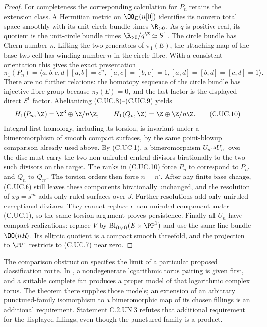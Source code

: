 \begin{proof}
For completeness the corresponding calculation
for $P_n$ retains the extension class. A Hermitian
metric on $\OO_E(n[0])$ identifies its nonzero
total space smoothly with its unit-circle bundle
times $\R_{>0}$. As $q$ is positive real, its
quotient is the unit-circle bundle times
$\R_{>0}/q^{\Z}\simeq S^1$. The circle bundle
has Chern number $n$. Lifting the two generators
of $\pi_1(E)$, the attaching map of the base
two-cell has winding number $n$ in the circle
fibre. With a consistent orientation this gives
the exact presentation
\[
 \pi_1(P_n)=
 \langle a,b,c,d\mid
 [a,b]=c^n,\ [a,c]=[b,c]=1,
 [a,d]=[b,d]=[c,d]=1\rangle.
\tag{C.UC.9}
\]
There are no further relations: the homotopy
sequence of the circle bundle has injective
fibre group because $\pi_2(E)=0$, and the last
factor is the displayed direct $S^1$ factor.
Abelianizing (C.UC.8)--(C.UC.9) yields
\[
 H_1(P_n,\Z)=\Z^3\oplus\Z/n\Z,
 \qquad H_1(Q_n,\Z)=\Z\oplus\Z/n\Z.
\tag{C.UC.10}
\]
Integral first homology, including its torsion,
is invariant under a bimeromorphism of smooth
compact surfaces, by the same point-blowup
comparison already used above. By (C.UC.1),
a bimeromorphism $U_n\dashrightarrow U_{n'}$
over the disc must carry the two non-uniruled
central divisors birationally to the two such
divisors on the target. The ranks in (C.UC.10)
force $P_n$ to correspond to $P_{n'}$ and
$Q_n$ to $Q_{n'}$. The torsion orders then
force $n=n'$. After any finite base change,
(C.UC.6) still leaves these components
birationally unchanged, and the resolution of
$xy=s^m$ adds only ruled surfaces over $J$.
Further resolutions add only uniruled
exceptional divisors. They cannot replace a
non-uniruled component under (C.UC.1), so
the same torsion argument proves persistence.
Finally all $U_n$ have compact realizations:
replace $V$ by
$\operatorname{Bl}_{(0,0)}(E\times\PP^1)$
and use the same line bundle $\OO(nR)$.
Its elliptic quotient is a compact smooth
threefold, and the projection to $\PP^1$
restricts to (C.UC.7) near zero.
\end{proof}

The comparison obstruction specifies the limit
of a particular proposed classification route.
In \cite[Sections~5.1--5.3]{KKN2008}, a
nondegenerate logarithmic torus pairing is
given first, and a suitable complete fan
produces a proper model of that logarithmic
complex torus. The theorem there supplies
those models; an extension of an arbitrary
punctured-family isomorphism to a
bimeromorphic map of its chosen fillings
is an additional requirement. Statement
C.2.UN.3 refutes that additional requirement
for the displayed fillings, even though
the punctured family is a product.
